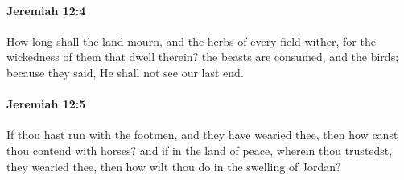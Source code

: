 		\paragraph{Jeremiah 12:4} %
			\label{JEREMIAH-12-4}

			How long shall the land mourn, and the herbs of every field wither, for the wickedness of them that dwell therein? the beasts are consumed, and the birds; because they said, He shall not see our last end.


		\paragraph{Jeremiah 12:5} %
			\label{JEREMIAH-12-5}

			If thou hast run with the footmen, and they have wearied thee, then how canst thou contend with horses? and if in the land of peace, wherein thou trustedst, they wearied thee, then how wilt thou do in the swelling of Jordan?

